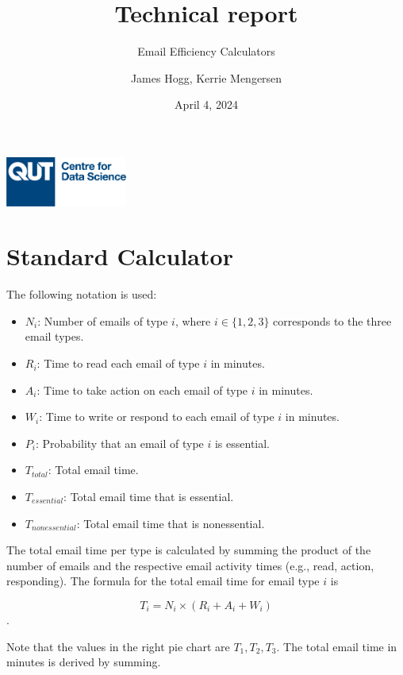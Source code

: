 \documentclass[
  reportpaper,
  DIV=11,
  numbers=noendperiod]{scrartcl}
\title{Technical report}
\subtitle{Email Efficiency Calculators}
\author{James Hogg, Kerrie Mengersen}
\date{April 4, 2024}
\providecommand{\tightlist}{%
  \setlength{\itemsep}{0pt}\setlength{\parskip}{0pt}}\usepackage{longtable,booktabs,array}
\begin{document}
\maketitle

\begin{center}
\includegraphics[width=0.3\textwidth]{../ed/static/ed/CDS-Logo-Blue.png}
\end{center}

\newpage{}

\section{Standard Calculator}\label{standard-calculator}

The following notation is used:

\begin{itemize}
\tightlist
\item
  \(N_i\): Number of emails of type \(i\), where \(i \in \{1,2,3\}\)
  corresponds to the three email types.
\item
  \(R_i\): Time to read each email of type \(i\) in minutes.
\item
  \(A_i\): Time to take action on each email of type \(i\) in minutes.
\item
  \(W_i\): Time to write or respond to each email of type \(i\) in
  minutes.
\item
  \(P_i\): Probability that an email of type \(i\) is essential.
\item
  \(T_{total}\): Total email time.
\item
  \(T_{essential}\): Total email time that is essential.
\item
  \(T_{nonessential}\): Total email time that is nonessential.
\end{itemize}

The total email time per type is calculated by summing the product of
the number of emails and the respective email activity times (e.g.,
read, action, responding). The formula for the total email time for
email type \(i\) is

\[ T_i = N_i \times (R_i + A_i + W_i) \].

Note that the values in the right pie chart are \(T_1,T_2,T_3\). The
total email time in minutes is derived by summing.
\end{document}
